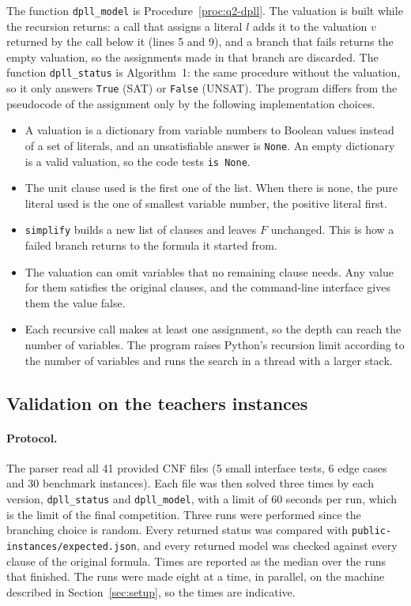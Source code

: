 The function \texttt{dpll\_model} is Procedure~\ref{proc:q2-dpll}. The valuation is built while the recursion returns: a call that assigns a literal $l$ adds it to the valuation $v$ returned by the call below it (lines 5 and 9), and a branch that fails returns the empty valuation, so the assignments made in that branch are discarded. The function \texttt{dpll\_status} is Algorithm~1: the same procedure without the valuation, so it only answers \texttt{True} (SAT) or \texttt{False} (UNSAT). The program differs from the pseudocode of the assignment only by the following implementation choices.
\begin{itemize}
\item A valuation is a dictionary from variable numbers to Boolean values instead of a set of literals, and an unsatisfiable answer is \texttt{None}. An empty dictionary is a valid valuation, so the code tests \texttt{is None}.
\item The unit clause used is the first one of the list. When there is none, the pure literal used is the one of smallest variable number, the positive literal first.
\item \texttt{simplify} builds a new list of clauses and leaves $F$ unchanged. This is how a failed branch returns to the formula it started from.
\item The valuation can omit variables that no remaining clause needs. Any value for them satisfies the original clauses, and the command-line interface gives them the value false.
\item Each recursive call makes at least one assignment, so the depth can reach the number of variables. The program raises Python's recursion limit according to the number of variables and runs the search in a thread with a larger stack.
\end{itemize}

\subsection{Validation on the teachers instances}

\paragraph{Protocol.}
The parser read all 41 provided CNF files (5 small interface tests, 6 edge cases and 30 benchmark instances). Each file was then solved three times by each version, \texttt{dpll\_status} and \texttt{dpll\_model}, with a limit of 60 seconds per run, which is the limit of the final competition. Three runs were performed since the branching choice is random. Every returned status was compared with \texttt{public-instances/expected.json}, and every returned model was checked against every clause of the original formula. Times are reported as the median over the runs that finished. The runs were made eight at a time, in parallel, on the machine described in Section~\ref{sec:setup}, so the times are indicative.

